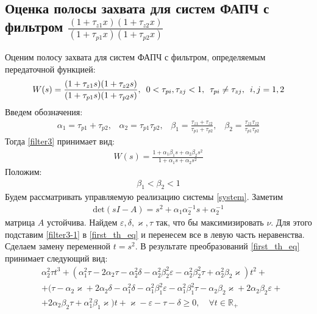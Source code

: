 \documentclass[a4paper,article,14pt]{extarticle}
\begin{document}
\subsection{Оценка полосы захвата для систем ФАПЧ с фильтром $\frac{(1+\tau_{z1}x)(1+\tau_{z2}x)}{(1+\tau_{p1}x)(1+\tau_{p2}x)}$}
Оценим полосу захвата для систем ФАПЧ с фильтром, определяемым передаточной функцией:
 \begin{equation}\label{filter3}
 \begin{aligned}
W(s) = \frac{(1+\tau_{z1}s)(1+\tau_{z2}s)}{(1+\tau_{p1}s)(1+\tau_{p2}s)}, \enskip 0<\tau_{pi},\tau_{zj} < 1, \enskip \tau_{pi} \neq \tau_{zj}, \enskip i,j=1,2
 \end{aligned}
\end{equation}
Введем обозначения:
 \begin{equation}
 \begin{aligned}
\alpha_1 = \tau_{p1} + \tau_{p2}\text{,}\quad 
\alpha_2 = \tau_{p1}\tau_{p2}\text{,}\quad 
\beta_1 = \frac{\tau_{z1}+\tau_{z2}}{\tau_{p1}+\tau_{p2}}\text{,}\quad 
\beta_2 = \frac{\tau_{z1}\tau_{z2}}{\tau_{p1}\tau_{p2}}
 \end{aligned}
\end{equation}
Тогда \eqref{filter3} принимает вид:
 \begin{equation}\label{filter3-1}
 \begin{aligned}
W(s) = \frac{1+\alpha_1\beta_1s + \alpha_2\beta_2s^2}{1+\alpha_1s + \alpha_2s^2}
 \end{aligned}
\end{equation}
Положим:
 \begin{equation}\label{restriction-1}
 \begin{aligned}
\beta_1 < \beta_2 < 1
 \end{aligned}
\end{equation}
Будем рассматривать управляемую реализацию системы \eqref{system}. Заметим
 \begin{equation}
 \begin{aligned}
\text{det}(sI-A) = s^2 + \alpha_1\alpha_2^{-1}s + \alpha_2^{-1}
 \end{aligned}
\end{equation}
матрица $A$ устойчива. Найдем $\varepsilon, \delta, \varkappa, \tau$ так, что бы максимизировать $\nu$. Для этого подставим \eqref{filter3-1} в \eqref{first_th_eq} и перенесем все в левую часть неравенства. Сделаем замену переменной $t = s^2$. В результате преобразований \eqref{first_th_eq} принимает следующий вид:
 \begin{equation}\label{filter3-th_first-1}
 \begin{aligned}
&\alpha_2^2\tau t^3 + (\alpha_1^2\tau - 2\alpha_2\tau - \alpha_2^2\delta - \alpha_2^2\beta_2^2\varepsilon - \alpha_2^2\beta_2^2\tau + \alpha_2^2\beta_2\varkappa)t^2 +\\
&+ (\tau - \alpha_2\varkappa + 2\alpha_2\delta - \alpha_1^2\delta - \alpha_1^2\beta_1^2\varepsilon - \alpha_1^2\beta_1^2\tau - \alpha_2\beta_2\varkappa + 2\alpha_2\beta_2\varepsilon + \\
&+2\alpha_2\beta_2\tau + \alpha_1^2\beta_1\varkappa)t + \varkappa - \varepsilon - \tau - \delta \geqslant 0, \quad \forall t \in \mathbb{R_+}
 \end{aligned}
\end{equation}
\end{document}
